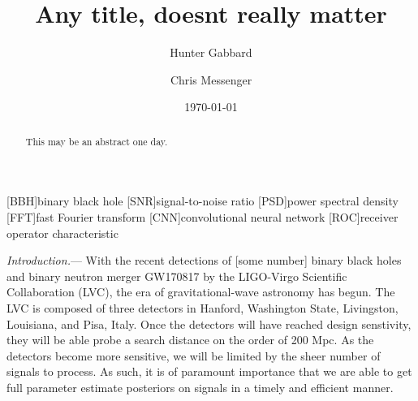 \documentclass[%
showpacs,
 amsmath,amssymb,
 aps,
 twocolumn,
 prl,
 reprint,
floatfix,
]{revtex4-1}
\newcommand{\dcc}{LIGO-P1700378}
\begin{document}

%
%
\title{Any title, doesnt really matter}

\author{Hunter Gabbard}
\author{Chris Messenger}

\date{\today}%


%
%
\begin{abstract} 
%
This may be an abstract one day.
%
\end{abstract}





\maketitle

[BBH]{binary black hole}
[SNR]{signal-to-noise ratio}
[PSD]{power spectral density}
[FFT]{fast Fourier transform}
[CNN]{convolutional neural network}
[ROC]{receiver operator characteristic}


%
%

%
%
\textit{Introduction.}--- 
%
With the recent detections of [some number] binary black holes \cite{detection papers} and binary neutron merger GW170817 \cite{BNS paper} by the LIGO-Virgo Scientific Collaboration (LVC), the era of gravitational-wave astronomy has begun. The LVC is composed of three detectors in Hanford, Washington State, Livingston, Louisiana, and Pisa, Italy. Once the detectors will have reached design senstivity, they will be able probe a search distance on the order of 200 Mpc. As the detectors become more sensitive, we will be limited by the sheer number of signals to process. As such, it is of paramount importance that we are able to get full parameter estimate posteriors on signals in a timely and efficient manner.
\end{document}
